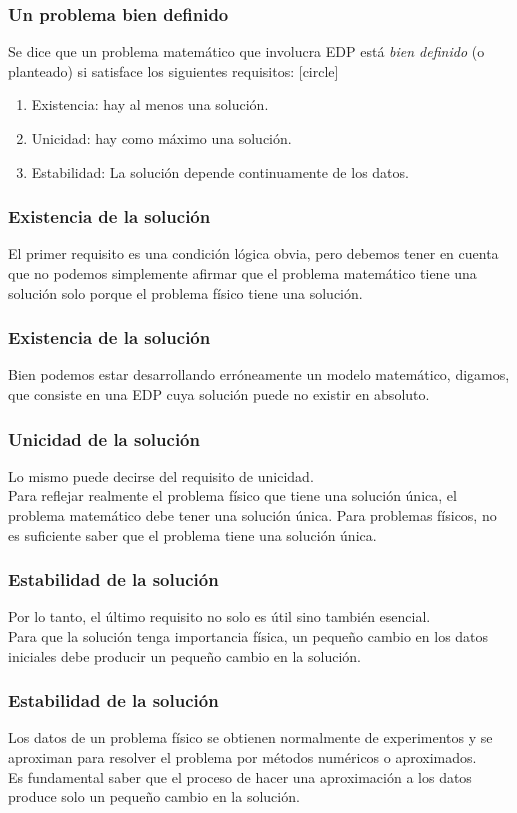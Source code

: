 \documentclass[12pt]{beamer}
\begin{document}
\begin{frame}
\frametitle{Un problema bien definido}
Se dice que un problema matemático que involucra EDP está \emph{bien definido} (o planteado) si satisface los siguientes requisitos:
[circle]
\begin{enumerate}[<+->]
\item Existencia: hay al menos una solución.
\item Unicidad: hay como máximo una solución.
\item Estabilidad: La solución depende continuamente de los datos.
\end{enumerate}
\end{frame}
\begin{frame}
\frametitle{Existencia de la solución}
El primer requisito es una condición lógica obvia, pero debemos tener en cuenta que no podemos simplemente afirmar que el problema matemático tiene una solución solo porque el problema físico tiene una solución.
\end{frame}
\begin{frame}
\frametitle{Existencia de la solución}
Bien podemos estar desarrollando erróneamente un modelo matemático, \pause digamos, que consiste en una EDP cuya solución puede no existir en absoluto.
\end{frame}
\begin{frame}
\frametitle{Unicidad de la solución}
Lo mismo puede decirse del requisito de unicidad.
\\
\bigskip
\pause
Para reflejar realmente el problema físico que tiene una solución única, \pause el problema matemático debe tener una solución única. \pause Para problemas físicos, no es suficiente saber que el problema tiene una solución única.
\end{frame}
\begin{frame}
\frametitle{Estabilidad de la solución}
Por lo tanto, el último requisito no solo es útil sino también esencial.
\\
\bigskip
\pause
Para que la solución tenga importancia física, \pause un pequeño cambio en los datos iniciales debe producir un pequeño cambio en la solución.
\end{frame}
\begin{frame}
\frametitle{Estabilidad de la solución}
Los datos de un problema físico se obtienen \break \hfill normalmente de experimentos y se aproximan para resolver el problema por métodos numéricos o aproximados.
\\
\bigskip
\pause
Es fundamental saber que el proceso de hacer una aproximación a los datos produce solo un pequeño cambio en la solución.
\end{frame}
\end{document}

